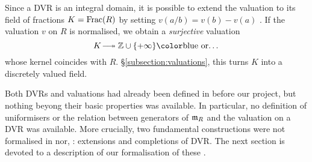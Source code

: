 \documentclass[sigplan,10pt,anonymous,review]{acmart}
\begin{document}
Since a DVR is an integral domain, it is possible to extend the valuation to its field of fractions $K=\operatorname{Frac}(R)$ by setting $v(a/b)=v(b)-v(a)$ . If the valuation $v$ on $R$ is normalised, we obtain a \emph{surjective} valuation
\[
K\longtwoheadrightarrow \ZZ\cup\{+\infty\}\text{\fil{or\dots}}
\]
whose kernel coincides with $\unit{R}$.  \S\ref{subsection:valuations}, this turns $K$ into a discretely valued field. 


Both DVRs and valuations had already been defined in  before our project, but nothing beyong their basic properties was available. In particular, no definition of uniformisers or the relation between generators of $\mathfrak{m}_{R}$ and the valuation on a DVR was available. More crucially, two fundamental constructions were not formalised in \mathlib nor, : extensions and completions of DVR. The next section is devoted to a description of our formalisation of these .
\end{document}
